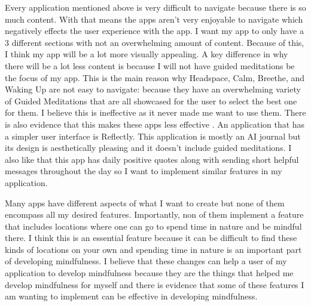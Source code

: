 \documentclass[10pt,twocolumn]{article}
\begin{document}
Every application mentioned above is very difficult to navigate because there is so much content. With that means the apps aren't very enjoyable to navigate which negatively effects the user experience with the app. I want my app to only have a 3 different sections with not an overwhelming amount of content. Because of this, I think my app will be a lot more visually appealing. A key difference in why there will be a lot less content is because I will not have guided meditations be the focus of my app. This is the main reason why Headspace, Calm, Breethe, and Waking Up are not easy to navigate: because they have an overwhelming variety of Guided Meditations that are all showcased for the user to select the best one for them. I believe this is ineffective as it never made me want to use them. There is also evidence that this makes these apps less effective \cite{Eysenbach2015Review}. An application that has a simpler user interface is Reflectly. This application is mostly an AI journal but its design is aesthetically pleasing and it doesn't include guided meditations. I also like that this app has daily positive quotes along with sending short helpful messages throughout the day so I want to implement similar features in my application.

Many apps have different aspects of what I want to create but none of them encompass all my desired features. Importantly, non of them implement a feature that includes locations where one can go to spend time in nature and be mindful there. I think this is an essential feature because it can be difficult to find these kinds of locations on your own and spending time in nature is an important part of developing mindfulness. I believe that these changes can help a user of my application to develop mindfulness because they are the things that helped me develop mindfulness for myself and there is evidence that some of these features I am wanting to implement can be effective in developing mindfulness.

\printbibliography 
\end{document}
